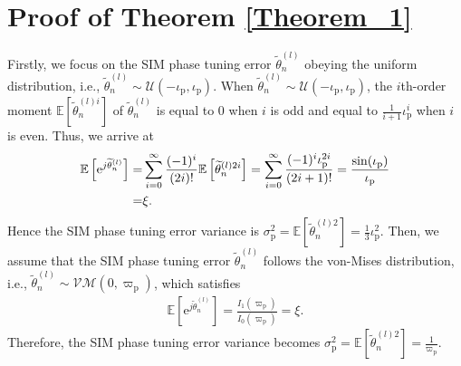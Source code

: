 \documentclass[lettersize,journal]{IEEEtran}
\theoremstyle{remark}
\begin{document}
\section{Proof of Theorem \ref{Theorem_1}}\label{Appendix_A}
Firstly, we focus on the SIM phase tuning error $\widetilde{\theta}_n^{(l)}$ obeying the uniform distribution, i.e., $\widetilde{\theta}_n^{(l)}\sim\mathcal{U}(-\iota_\mathrm{p},\iota_\mathrm{p})$. When $\widetilde{\theta}_n^{(l)}\sim\mathcal{U}(-\iota_\mathrm{p},\iota_\mathrm{p})$, the $i$th-order moment $\mathbb{E}[\widetilde{\theta}_n^{(l)i}]$ of $\widetilde{\theta}_n^{(l)}$ is equal to 0 when $i$ is odd and equal to $\frac{1}{i+1}\iota_\mathrm{p}^i$ when $i$ is even. Thus, we arrive at
\begin{align}\label{Appendix_A_1}
    \notag\mathbb{E}\left[\mathrm{e}^{j\widetilde{\theta}_n^{(l)}}\right]
    =&\sum_{i=0}^{\infty}\frac{(-1)^i}{(2i)!}\mathbb{E}
    \left[\widetilde{\theta}_n^{(l)2i}\right]
    =\sum_{i=0}^{\infty}\frac{(-1)^i\iota_\mathrm{p}^{2i}}{(2i+1)!}
    =\frac{\sin(\iota_\mathrm{p})}{\iota_\mathrm{p}}\\
    =&\xi.
\end{align}
Hence the SIM phase tuning error variance is $\sigma_\mathrm{p}^2=\mathbb{E}[\widetilde{\theta}_n^{(l)2}]
=\frac{1}{3}\iota_\mathrm{p}^2$. Then, we assume that the SIM phase tuning error $\widetilde{\theta}_n^{(l)}$ follows the von-Mises distribution, i.e., $\widetilde{\theta}_n^{(l)}\sim\mathcal{VM}(0,\varpi_\text{p})$, which satisfies~\cite{hillen2017moments}
\begin{align}\label{Appendix_A_2}
    \mathbb{E}\left[\mathrm{e}^{j\widetilde{\theta}_n^{(l)}}\right]=\frac{I_{1}(\varpi_\text{p})}
    {I_{0}(\varpi_\text{p})}=\xi.
\end{align}
Therefore, the SIM phase tuning error variance becomes $\sigma_\mathrm{p}^2=\mathbb{E}[\widetilde{\theta}_n^{(l)2}]=\frac{1}{\varpi_\text{p}}$.
\end{document}
